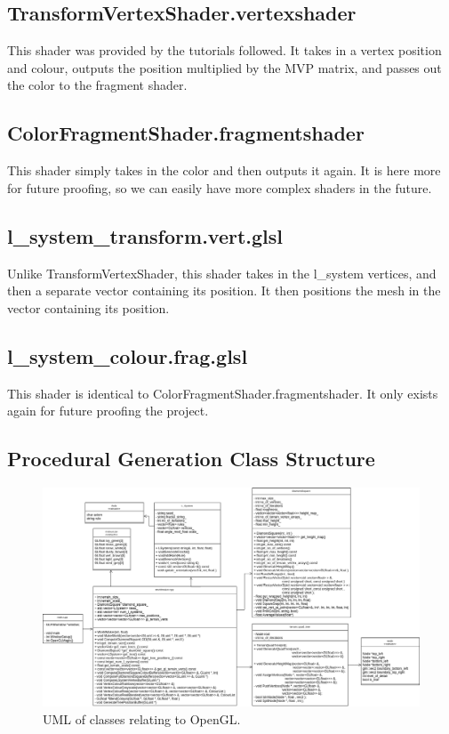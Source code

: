 \documentclass[a4paper,10pt]{report}
\begin{document}
\subsection{TransformVertexShader.vertexshader}
This shader was provided by the tutorials followed. It takes in a vertex position and colour, outputs the position multiplied by the MVP matrix, and passes out the color to the fragment shader.


\subsection{ColorFragmentShader.fragmentshader} This shader simply takes in the color and then outputs it again. It is here more for future proofing, so we can easily have more complex shaders in the future.  

\subsection{l\_system\_transform.vert.glsl}
Unlike TransformVertexShader, this shader takes in the l\_system vertices, and then a separate vector containing its position. It then positions the mesh in the vector containing its position.


\subsection{l\_system\_colour.frag.glsl}
This shader is identical to ColorFragmentShader.fragmentshader. It only exists again for future proofing the project. 


\clearpage
\subsection{Procedural Generation Class Structure}

\begin{figure}[h!]
\centering
  \includegraphics[width=1\textwidth]{Images/Charts/GenerationUML.png}
 \caption{UML of classes relating to OpenGL.}
 \label{fig:GenerationUML}
\end{figure}
\end{document}
